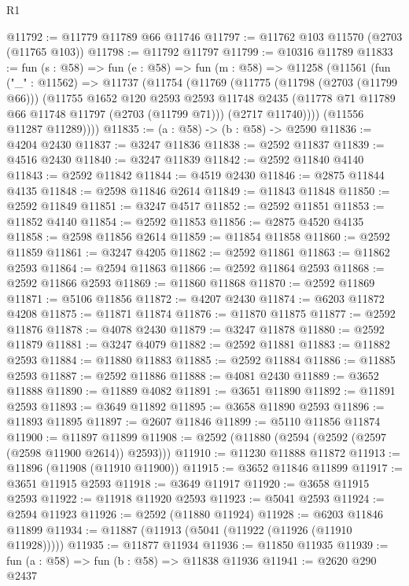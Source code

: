 \begin{lexlean}{R1}
\begin{coremodule}
@11792 := @11779 @11789 @66 @11746
@11797 := @11762 @103 @11570 (@2703 (@11765 @103))
@11798 := @11792 @11797
@11799 := @10316 @11789
@11833 := fun (s : @58) =>
  fun (e : @58) =>
  fun (m : @58) =>
  @11258
    (@11561
      (fun ("_" : @11562) =>
      @11737
        (@11754
          (@11769
            (@11775
              (@11798 (@2703 (@11799 @66)))
              (@11755
                @1652
                @120
                @2593
                @2593
                @11748
                @2435
                (@11778 @71 @11789 @66 @11748 @11797 (@2703 (@11799 @71)))
                (@2717 @11740))))
          (@11556 @11287 @11289))))
@11835 := (a : @58) -> (b : @58) -> @2590
@11836 := @4204 @2430
@11837 := @3247 @11836
@11838 := @2592 @11837
@11839 := @4516 @2430
@11840 := @3247 @11839
@11842 := @2592 @11840 @4140
@11843 := @2592 @11842
@11844 := @4519 @2430
@11846 := @2875 @11844 @4135
@11848 := @2598 @11846 @2614
@11849 := @11843 @11848
@11850 := @2592 @11849
@11851 := @3247 @4517
@11852 := @2592 @11851
@11853 := @11852 @4140
@11854 := @2592 @11853
@11856 := @2875 @4520 @4135
@11858 := @2598 @11856 @2614
@11859 := @11854 @11858
@11860 := @2592 @11859
@11861 := @3247 @4205
@11862 := @2592 @11861
@11863 := @11862 @2593
@11864 := @2594 @11863
@11866 := @2592 @11864 @2593
@11868 := @2592 @11866 @2593
@11869 := @11860 @11868
@11870 := @2592 @11869
@11871 := @5106 @11856
@11872 := @4207 @2430
@11874 := @6203 @11872 @4208
@11875 := @11871 @11874
@11876 := @11870 @11875
@11877 := @2592 @11876
@11878 := @4078 @2430
@11879 := @3247 @11878
@11880 := @2592 @11879
@11881 := @3247 @4079
@11882 := @2592 @11881
@11883 := @11882 @2593
@11884 := @11880 @11883
@11885 := @2592 @11884
@11886 := @11885 @2593
@11887 := @2592 @11886
@11888 := @4081 @2430
@11889 := @3652 @11888
@11890 := @11889 @4082
@11891 := @3651 @11890
@11892 := @11891 @2593
@11893 := @3649 @11892
@11895 := @3658 @11890 @2593
@11896 := @11893 @11895
@11897 := @2607 @11846
@11899 := @5110 @11856 @11874
@11900 := @11897 @11899
@11908 := @2592 (@11880 (@2594 (@2592 (@2597 (@2598 @11900 @2614)) @2593)))
@11910 := @11230 @11888 @11872
@11913 := @11896 (@11908 (@11910 @11900))
@11915 := @3652 @11846 @11899
@11917 := @3651 @11915 @2593
@11918 := @3649 @11917
@11920 := @3658 @11915 @2593
@11922 := @11918 @11920 @2593
@11923 := @5041 @2593
@11924 := @2594 @11923
@11926 := @2592 (@11880 @11924)
@11928 := @6203 @11846 @11899
@11934 := @11887 (@11913 (@5041 (@11922 (@11926 (@11910 @11928)))))
@11935 := @11877 @11934
@11936 := @11850 @11935
@11939 := fun (a : @58) => fun (b : @58) => @11838 @11936
@11941 := @2620 @290 @2437

\end{coremodule}
\end{lexlean}
